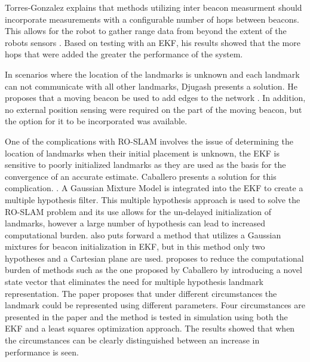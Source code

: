 \documentclass[conference]{IEEEtran}
\begin{document}
Torres-Gonzalez explains that methods utilizing inter beacon measurment should incorporate measurements with a configurable number of hops between beacons. This allows for the robot to gather range data from beyond the extent of the robots sensors \cite{Torres-Gonzalez2015}. Based on testing with an EKF, his results showed that the more hops that were added the greater the performance of the system. 

In scenarios where the location of the landmarks is unknown and each landmark can not communicate with all other landmarks, Djugash presents a solution. He proposes that a moving beacon be used to add edges to the network \cite{Djugash2006}. In addition, no external position sensing were required on the part of the moving beacon, but the option for it to be incorporated was available. 


One of the complications with RO-SLAM involves the issue of determining the location of landmarks when their initial placement is unknown, the EKF is sensitive to poorly initialized landmarks as they are used as the basis for the convergence of an accurate estimate. Caballero presents a solution for this complication. \cite{Caballero2010}. A Gaussian Mixture Model is integrated into the EKF to create a multiple hypothesis filter.  This multiple hypothesis approach is used to solve the RO-SLAM problem and its use allows for the un-delayed initialization of landmarks, however a large number of hypothesis can lead to increased computational burden. \cite{Geneve2015} also puts forward a method that utilizes a Gaussian mixtures for beacon initialization in EKF, but in this method only two hypotheses and a Cartesian plane are used.   \cite{Ahmad2011a} proposes to reduce the computational burden of methods such as the one proposed by Caballero \cite{Caballero2010} by introducing a novel state vector that eliminates the need for multiple hypothesis landmark representation. The paper proposes that under different circumstances the landmark could be represented using different parameters. Four circumstances are presented in the paper and the method is tested in simulation using both the EKF and a least squares optimization approach. The results showed that when the circumstances can be clearly distinguished between an increase in performance is seen.
\end{document}
